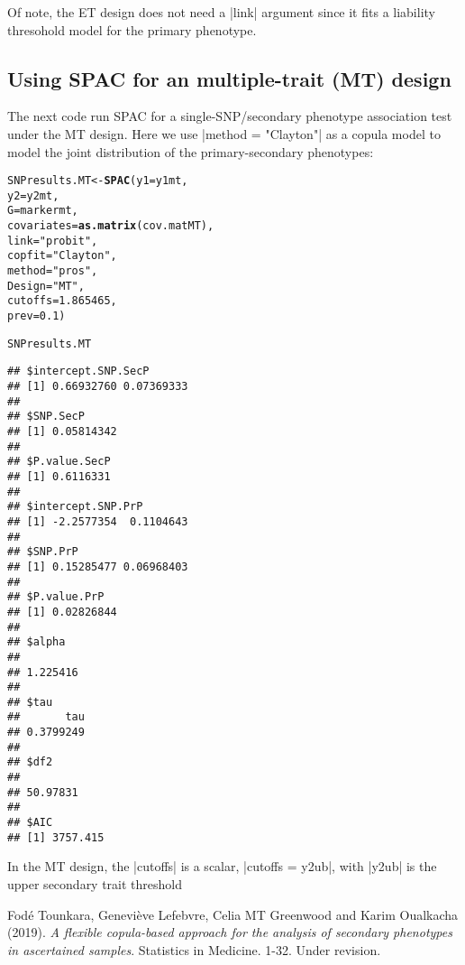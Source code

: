 \documentclass{article}\usepackage[]{graphicx}\usepackage[]{color}
\makeatletter
\newcommand{\hlnum}[1]{\textcolor[rgb]{0.686,0.059,0.569}{#1}}%
\newcommand{\hlstr}[1]{\textcolor[rgb]{0.192,0.494,0.8}{#1}}%
\newcommand{\hlstd}[1]{\textcolor[rgb]{0.345,0.345,0.345}{#1}}%
\newcommand{\hlkwb}[1]{\textcolor[rgb]{0.69,0.353,0.396}{#1}}%
\newcommand{\hlkwc}[1]{\textcolor[rgb]{0.333,0.667,0.333}{#1}}%
\newcommand{\hlkwd}[1]{\textcolor[rgb]{0.737,0.353,0.396}{\textbf{#1}}}%
\newenvironment{kframe}{%
 \def\at@end@of@kframe{}%
 \ifinner\ifhmode%
  \def\at@end@of@kframe{\end{minipage}}%
  \begin{minipage}{\columnwidth}%
 \fi\fi%
 \def\FrameCommand##1{\hskip\@totalleftmargin \hskip-\fboxsep
 \colorbox{shadecolor}{##1}\hskip-\fboxsep
     \hskip-\linewidth \hskip-\@totalleftmargin \hskip\columnwidth}%
 \MakeFramed {\advance\hsize-\width
   \@totalleftmargin\z@ \linewidth\hsize
   \@setminipage}}%
 {\par\unskip\endMakeFramed%
 \at@end@of@kframe}
\newenvironment{knitrout}{}{} %
\makeatother
\begin{document}
Of note, the ET design does not need a |link| argument since it fits a liability thresohold model for the primary phenotype.

\subsection{Using SPAC for an multiple-trait (MT) design}
\label{sec:using-SPAC-MT}
The next code run SPAC for a single-SNP/secondary phenotype association test under the MT design. Here we use |method = "Clayton"| as a copula model to model the joint distribution of the primary-secondary phenotypes:
\begin{knitrout}
\color{fgcolor}\begin{kframe}
\begin{alltt}
\hlstd{SNPresults.MT} \hlkwb{<-} \hlkwd{SPAC}\hlstd{(}\hlkwc{y1} \hlstd{= y1mt,}
                   \hlkwc{y2} \hlstd{= y2mt,}
                   \hlkwc{G} \hlstd{= markermt,}
                   \hlkwc{covariates} \hlstd{=} \hlkwd{as.matrix}\hlstd{(cov.matMT),}
                   \hlkwc{link} \hlstd{=} \hlstr{"probit"}\hlstd{,}
                   \hlkwc{copfit} \hlstd{=} \hlstr{"Clayton"}\hlstd{,}
                   \hlkwc{method} \hlstd{=} \hlstr{"pros"}\hlstd{,}
                   \hlkwc{Design} \hlstd{=} \hlstr{"MT"}\hlstd{,}
                   \hlkwc{cutoffs} \hlstd{=} \hlnum{1.865465}\hlstd{,}
                   \hlkwc{prev} \hlstd{=} \hlnum{0.1}\hlstd{)}
\end{alltt}


{\ttfamily\noindent\itshape\color{messagecolor}{\#\# Starting association analysis of the SNP...}}

{\ttfamily\noindent\color{warningcolor}{\#\# Warning in sqrt(diag(mvar)): NaNs produced}}\begin{alltt}
\hlstd{SNPresults.MT}
\end{alltt}
\begin{verbatim}
## $intercept.SNP.SecP
## [1] 0.66932760 0.07369333
## 
## $SNP.SecP
## [1] 0.05814342
## 
## $P.value.SecP
## [1] 0.6116331
## 
## $intercept.SNP.PrP
## [1] -2.2577354  0.1104643
## 
## $SNP.PrP
## [1] 0.15285477 0.06968403
## 
## $P.value.PrP
## [1] 0.02826844
## 
## $alpha
##          
## 1.225416 
## 
## $tau
##       tau 
## 0.3799249 
## 
## $df2
##          
## 50.97831 
## 
## $AIC
## [1] 3757.415
\end{verbatim}
\end{kframe}
\end{knitrout}

In the MT design, the |cutoffs| is a scalar, |cutoffs = y2ub|, with |y2ub| is the upper secondary trait threshold

\begin{thebibliography}{99}
 Fod\'e Tounkara, Genevi\`eve Lefebvre, Celia MT Greenwood and Karim Oualkacha (2019). \emph{A flexible copula-based approach for the analysis of secondary phenotypes in ascertained samples}. Statistics in Medicine. 1-32. Under revision.
\end{thebibliography}
\end{document}
